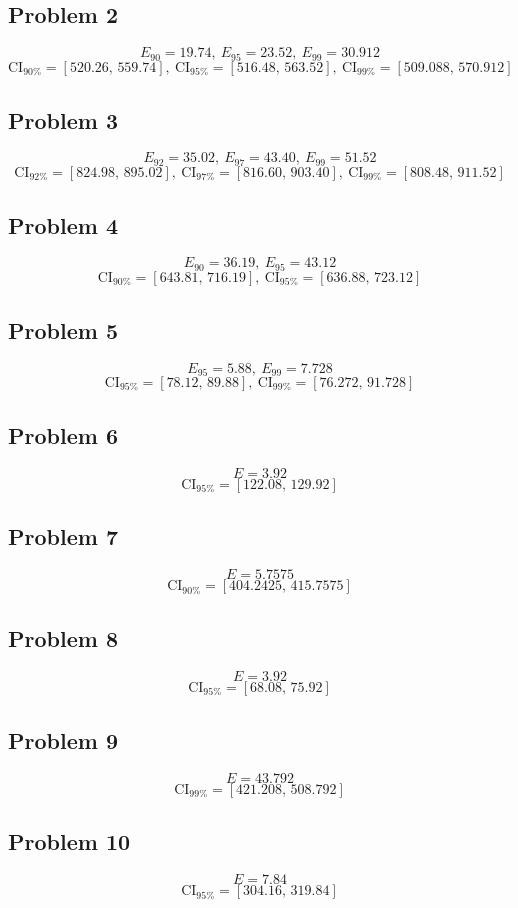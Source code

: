 \subsection*{Problem 2}
\[
E_{90}=19.74,\ E_{95}=23.52,\ E_{99}=30.912
\]
\[
\text{CI}_{90\%}=[520.26,\,559.74],\ \text{CI}_{95\%}=[516.48,\,563.52],\ \text{CI}_{99\%}=[509.088,\,570.912]
\]

\subsection*{Problem 3}
\[
E_{92}=35.02,\ E_{97}=43.40,\ E_{99}=51.52
\]
\[
\text{CI}_{92\%}=[824.98,\,895.02],\ \text{CI}_{97\%}=[816.60,\,903.40],\ \text{CI}_{99\%}=[808.48,\,911.52]
\]

\subsection*{Problem 4}
\[
E_{90}=36.19,\ E_{95}=43.12
\]
\[
\text{CI}_{90\%}=[643.81,\,716.19],\ \text{CI}_{95\%}=[636.88,\,723.12]
\]

\subsection*{Problem 5}
\[
E_{95}=5.88,\ E_{99}=7.728
\]
\[
\text{CI}_{95\%}=[78.12,\,89.88],\ \text{CI}_{99\%}=[76.272,\,91.728]
\]

\subsection*{Problem 6}
\[
E=3.92
\]
\[
\text{CI}_{95\%}=[122.08,\,129.92]
\]

\subsection*{Problem 7}
\[
E=5.7575
\]
\[
\text{CI}_{90\%}=[404.2425,\,415.7575]
\]

\subsection*{Problem 8}
\[
E=3.92
\]
\[
\text{CI}_{95\%}=[68.08,\,75.92]
\]

\subsection*{Problem 9}
\[
E=43.792
\]
\[
\text{CI}_{99\%}=[421.208,\,508.792]
\]

\subsection*{Problem 10}
\[
E=7.84
\]
\[
\text{CI}_{95\%}=[304.16,\,319.84]
\]


